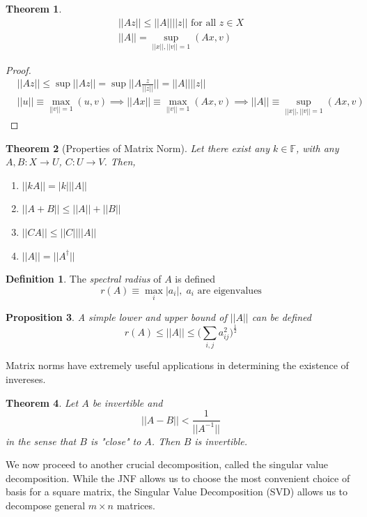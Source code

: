 \documentclass{article}
\newtheorem{theorem}{Theorem}[section]
\newtheorem{proposition}[theorem]{Proposition}
\theoremstyle{remark}
\theoremstyle{definition}
\newtheorem{definition}{Definition}[section]
\begin{document}
\begin{theorem}
\begin{align}
    ||A z|| \leq ||A|| ||z|| \text{ for all } z \in X \\
    ||A|| = \sup_{||x||, ||v|| = 1} (A x, v)
\end{align}
\end{theorem}
\begin{proof}
\begin{align*}
    &||A z|| \leq \sup{||A z||} = \sup{\Big|\Big| A \frac{z}{||z||} \Big|\Big|} = ||A|| ||z|| \\
    &||u|| \equiv \max_{||v||=1} (u, v) \implies ||A x|| \equiv \max_{||v||=1} (Ax, v) \implies ||A|| \equiv \sup_{||x||, ||v|| =1} (A x, v)
\end{align*}
\end{proof}

\begin{theorem}[Properties of Matrix Norm]
Let there exist any $k \in \mathbb{F}$, with any $A, B: X \longrightarrow U$, $C: U \longrightarrow V$. Then, 
\begin{enumerate}
    \item $||k A|| = |k| ||A||$
    \item $||A + B|| \leq ||A|| + ||B||$
    \item $||C A|| \leq ||C|| ||A||$
    \item $||A|| = ||A^\dagger||$
\end{enumerate}
\end{theorem}

\begin{definition}
The \textit{spectral radius} of $A$ is defined
\[r(A) \equiv \max_i |a_i|, \; a_i \text{ are eigenvalues}\]
\end{definition}

\begin{proposition}
A simple lower and upper bound of $||A||$ can be defined
\[ r(A) \leq ||A|| \leq \bigg( \sum_{i, j} a_{i j}^2 \bigg)^\frac{1}{2}\]
\end{proposition}

Matrix norms have extremely useful applications in determining the existence of invereses. 

\begin{theorem}
Let $A$ be invertible and 
\[||A - B|| < \frac{1}{||A^{-1}||}\]
in the sense that $B$ is "close" to $A$. Then $B$ is invertible. 
\end{theorem}
We now proceed to another crucial decomposition, called the singular value decomposition. While the JNF allows us to choose the most convenient choice of basis for a square matrix, the Singular Value Decomposition (SVD) allows us to decompose general $m \times n$ matrices. 
\end{document}
